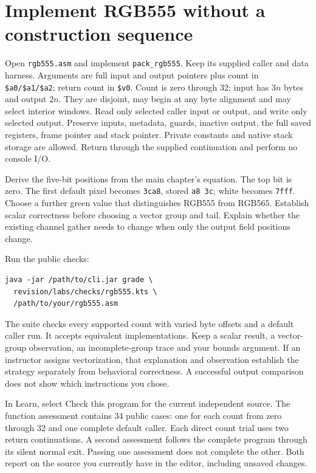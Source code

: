 \section{Implement RGB555 without a construction sequence}

Open \texttt{rgb555.asm} and implement \texttt{pack\_rgb555}. Keep its supplied
caller and data harness. Arguments are full input and output pointers plus count
in \texttt{\$a0/\$a1/\$a2}; return count in \texttt{\$v0}. Count is zero through
32; input has $3n$ bytes and output $2n$. They are disjoint, may begin at any byte
alignment and may select interior windows. Read only selected caller input or
output, and write only selected output. Preserve inputs, metadata, guards,
inactive output, the full saved registers, frame pointer and stack pointer.
Private constants and native stack storage are allowed. Return through the
supplied continuation and perform no console I/O.

Derive the five-bit positions from the main chapter's equation. The top bit is
zero. The first default pixel becomes \texttt{3ca8}, stored \texttt{a8 3c}; white
becomes \texttt{7fff}. Choose a further green value that distinguishes RGB555
from RGB565. Establish scalar correctness before choosing a vector group and tail.
Explain whether the existing channel gather needs to change when only the output
field positions change.

Run the public checks:
\begin{verbatim}
java -jar /path/to/cli.jar grade \
  revision/labs/checks/rgb555.kts \
  /path/to/your/rgb555.asm
\end{verbatim}
The suite checks every supported count with varied byte offsets and a default
caller run. It accepts equivalent implementations. Keep a scalar result, a
vector-group observation, an incomplete-group trace and your bounds argument.
If an instructor assigns vectorization, that explanation and observation establish
the strategy separately from behavioral correctness. A successful output comparison
does not show which instructions you chose.


In Learn, select Check this program for the current independent source. The
function assessment contains 34 public cases: one for each count from zero
through 32 and one complete default caller. Each direct count trial uses two
return continuations. A second assessment follows the complete program through
its silent normal exit. Passing one assessment does not complete the other.
Both report on the source you currently have in the editor, including unsaved
changes.

